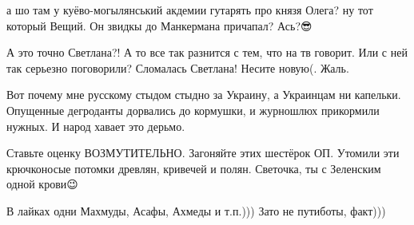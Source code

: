 \begin{itemize}
 
а шо там у куёво-могылянський акдемии гутарять про князя Олега? ну тот который
Вещий. Он звидкы до Манкермана причапал? Ась?😎

 
А это точно Светлана?! А то все так разнится с тем, что на тв говорит. Или с ней так серьезно поговорили? Сломалась Светлана! Несите новую(. Жаль.

 
Вот почему мне русскому стыдом стыдно за Украину, а Украинцам ни капельки. Опущенные дегроданты дорвались до кормушки, и журношлюх прикормили нужных. И народ хавает это дерьмо.

 
Ставьте оценку ВОЗМУТИТЕЛЬНО. Загоняйте этих шестёрок ОП. Утомили эти крючконосые потомки древлян, кривечей и полян. Светочка, ты с Зеленским одной крови😉

 
В лайках одни Махмуды, Асафы, Ахмеды и т.п.))) Зато не путиботы, факт)))

\end{itemize}

